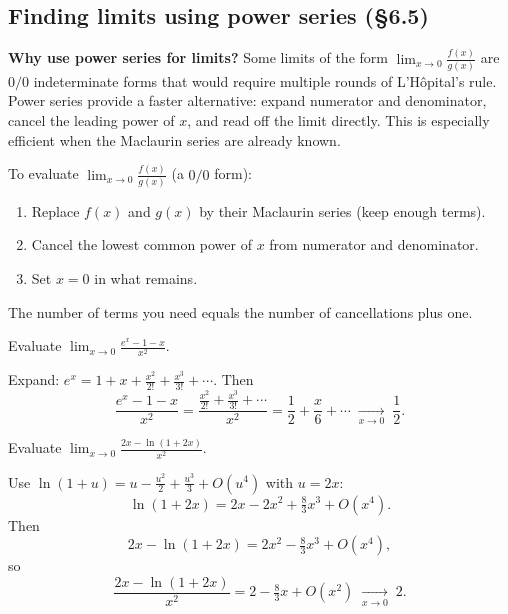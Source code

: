 \subsection{Finding limits using power series (\S6.5)}

\noindent\textbf{Why use power series for limits?}
Some limits of the form $\lim_{x\to 0}\frac{f(x)}{g(x)}$ are $0/0$ indeterminate forms that would require multiple rounds of L'H\^{o}pital's rule.
Power series provide a faster alternative:
expand numerator and denominator, cancel the leading power of $x$, and read off the limit directly.
This is especially efficient when the Maclaurin series are already known.

\begin{keyformula}[title={Key Formula: series limit technique}]
To evaluate $\lim_{x\to 0}\frac{f(x)}{g(x)}$ (a $0/0$ form):
\begin{enumerate}[leftmargin=*]
\item Replace $f(x)$ and $g(x)$ by their Maclaurin series (keep enough terms).
\item Cancel the lowest common power of $x$ from numerator and denominator.
\item Set $x=0$ in what remains.
\end{enumerate}
The number of terms you need equals the number of cancellations plus one.
\end{keyformula}

\begin{examplebox}[title={Worked Example: series limit (Lecture Ex.~6.20)}]
Evaluate $\displaystyle\lim_{x\to 0}\frac{e^x-1-x}{x^2}$.

\smallskip
Expand: $e^x=1+x+\frac{x^2}{2!}+\frac{x^3}{3!}+\cdots$.
Then
\[
\frac{e^x-1-x}{x^2}=\frac{\frac{x^2}{2!}+\frac{x^3}{3!}+\cdots}{x^2}
=\frac{1}{2}+\frac{x}{6}+\cdots\;\xrightarrow[x\to 0]{}\;\frac{1}{2}.
\]
\end{examplebox}

\begin{examplebox}[title={Worked Example: series limit with $\ln$ (Tutorial~12, Q4(a))}]
Evaluate $\displaystyle\lim_{x\to 0}\frac{2x-\ln(1+2x)}{x^2}$.

\smallskip
Use $\ln(1+u)=u-\frac{u^2}{2}+\frac{u^3}{3}+O(u^4)$ with $u=2x$:
\[
\ln(1+2x)=2x-2x^2+\tfrac{8}{3}x^3+O(x^4).
\]
Then
\[
2x-\ln(1+2x)=2x^2-\tfrac{8}{3}x^3+O(x^4),
\]
so
\[
\frac{2x-\ln(1+2x)}{x^2}=2-\tfrac{8}{3}x+O(x^2)\;\xrightarrow[x\to 0]{}\;2.
\]
\end{examplebox}

